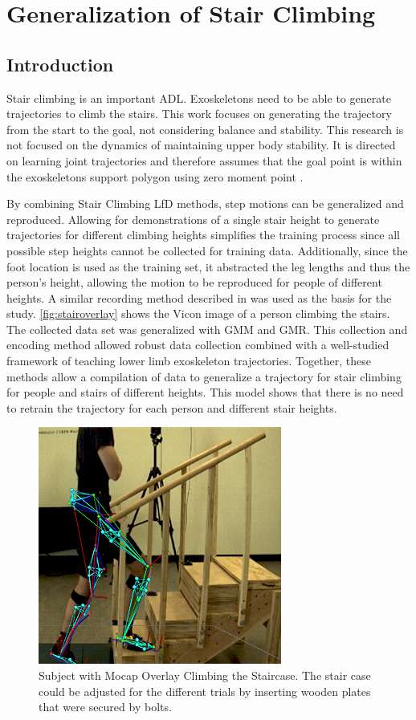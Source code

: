 \chapter{Generalization of Stair Climbing}

\section{Introduction}
Stair climbing is an important ADL. Exoskeletons need to be able to generate trajectories to climb the stairs. This work focuses on generating the trajectory from the start to the goal, not considering balance and stability. This research is not focused on the dynamics of maintaining upper body stability. It is directed on learning joint trajectories and therefore assumes that the goal point is within the exoskeletons support polygon using zero moment point \cite{kajita2003biped}.


By combining Stair Climbing LfD methods, step motions can be generalized and reproduced. Allowing for demonstrations of a single stair height to generate trajectories for different climbing heights simplifies the training process since all possible step heights cannot be collected for training data. Additionally, since the foot location is used as the training set, it abstracted the leg lengths and thus the person's height, allowing the motion to be reproduced for people of different heights. A similar recording method described in \cite{hicks2011lower} was used as the basis for the study. \autoref{fig:stairoverlay} shows the Vicon image of a person climbing the stairs. The collected data set was generalized with GMM and GMR. This collection and encoding method allowed robust data collection combined with a well-studied framework of teaching lower limb exoskeleton trajectories. Together, these methods allow a compilation of data to generalize a trajectory for stair climbing for people and stairs of different heights. This model shows that there is no need to retrain the trajectory for each person and different stair heights.



\begin{figure}
    \centering
    \includegraphics{images/stairs/mocap_overlay_stairs.jpg}
    \caption[Stair Mocap Overlay]{Subject with Mocap Overlay Climbing the Staircase. The stair case could be adjusted for the different trials by inserting wooden plates that were secured by bolts.}
    \label{fig:stairoverlay}
\end{figure}

